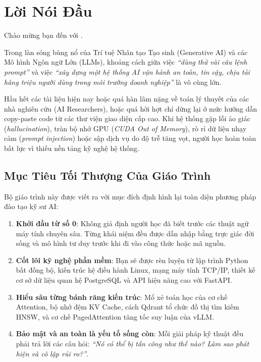 
\chapter*{Lời Nói Đầu}

Chào mừng bạn đến với \textbf{\booktitle}.

Trong làn sóng bùng nổ của Trí tuệ Nhân tạo Tạo sinh (Generative AI) và các Mô hình Ngôn ngữ Lớn (LLMs), khoảng cách giữa việc \textit{``dùng thử vài câu lệnh prompt''} và việc \textit{``xây dựng một hệ thống AI vận hành an toàn, tin cậy, chịu tải hàng triệu người dùng trong môi trường doanh nghiệp''} là vô cùng lớn.

Hầu hết các tài liệu hiện nay hoặc quá hàn lâm nặng về toán lý thuyết của các nhà nghiên cứu (AI Researchers), hoặc quá hời hợt chỉ dừng lại ở mức hướng dẫn copy-paste code từ các thư viện giao diện cấp cao. Khi hệ thống gặp lỗi ảo giác (\textit{hallucination}), tràn bộ nhớ GPU (\textit{CUDA Out of Memory}), rò rỉ dữ liệu nhạy cảm (\textit{prompt injection}) hoặc sập dịch vụ do độ trễ tăng vọt, người học hoàn toàn bất lực vì thiếu nền tảng kỹ nghệ hệ thống.

\section*{Mục Tiêu Tối Thượng Của Giáo Trình}

Bộ giáo trình này được viết ra với mục đích định hình lại toàn diện phương pháp đào tạo kỹ sư AI:
\begin{enumerate}
  \item \textbf{Khởi đầu từ số 0}: Không giả định người học đã biết trước các thuật ngữ máy tính chuyên sâu. Từng khái niệm đều được dẫn nhập bằng trực giác đời sống và mô hình tư duy trước khi đi vào công thức hoặc mã nguồn.
  \item \textbf{Cốt lõi kỹ nghệ phần mềm}: Bạn sẽ được rèn luyện từ lập trình Python bất đồng bộ, kiến trúc hệ điều hành Linux, mạng máy tính TCP/IP, thiết kế cơ sở dữ liệu quan hệ PostgreSQL và API hiệu năng cao với FastAPI.
  \item \textbf{Hiểu sâu từng bánh răng kiến trúc}: Mổ xẻ toán học của cơ chế Attention, bộ nhớ đệm KV Cache, cách Qdrant tổ chức đồ thị tìm kiếm HNSW, và cơ chế PagedAttention tăng tốc suy luận của vLLM.
  \item \textbf{Bảo mật và an toàn là yếu tố sống còn}: Mỗi giải pháp kỹ thuật đều phải trả lời các câu hỏi: \textit{``Nó có thể bị tấn công như thế nào? Làm sao phát hiện và cô lập rủi ro?''}.
\end{enumerate}


